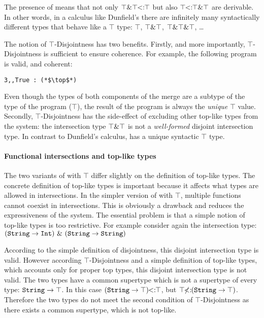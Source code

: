 \noindent The presence of   means that not only  
${\top\& \top} \!\!<:\!\! {\top}$ but also 
${\top} \!\!<:\!\! {\top \& \top}$ are derivable.
In other words, in a calculus like Dunfield's there are infinitely
many syntactically different types that behave like a $\top$ type: 
$\top$, $\top \& \top$, $\top \& \top \& \top$, \ldots

The notion of $\top$-Disjointness has two benefits. Firstly, and more
importantly, $\top$-Disjointness is sufficient to ensure
coherence. For example, the following program is valid, and coherent:

\begin{lstlisting}
3,,True : (*$\top$*) 
\end{lstlisting}

\noindent Even though the types of both components of the merge are a
subtype of the type of the program ($\top$), the result of the
program is always the \emph{unique} $\top$ value. Secondly,
$\top$-Disjointness has the side-effect of excluding other top-like
types from the system: the intersection type $\top \& \top$ is not
a \emph{well-formed} disjoint intersection type. In contrast to Dunfield's
calculus, \name has a unique syntactic $\top$ type.

\paragraph{Functional intersections and top-like types}
The two variants of \name with $\top$ differ slightly on the
definition of top-like types. The concrete definition of top-like 
types is important because it affects what types are allowed in intersections.
In the simpler version of \name with $\top$, multiple
functions cannot coexist in intersections. This is obviously a drawback and 
reduces the expressiveness of the system. The essential
problem is that a simple notion of top-like types is too restrictive. 
For example consider again the intersection type: \\

$(\texttt{String} \to \texttt{Int})~\&~(\texttt{String} \to  \texttt{String})$
\vspace{5pt}

\noindent According to the simple definition of disjointness, this disjoint
intersection type is valid. However according $\top$-Disjointness and a simple definition
of top-like types, which accounts only for proper top types, this disjoint intersection type is not valid. 
The two types have a common supertype which is not a supertype of
every type: $\texttt{String} \to \top$. In this case $(\texttt{String} \to
\top)\!\!<:\!\!\top$, but $\top\!\!\not<:\!\!(\texttt{String} \to
\top)$. Therefore the two types do not meet the second condition of
$\top$-Disjointness as there exists a common supertype, which is not top-like.

